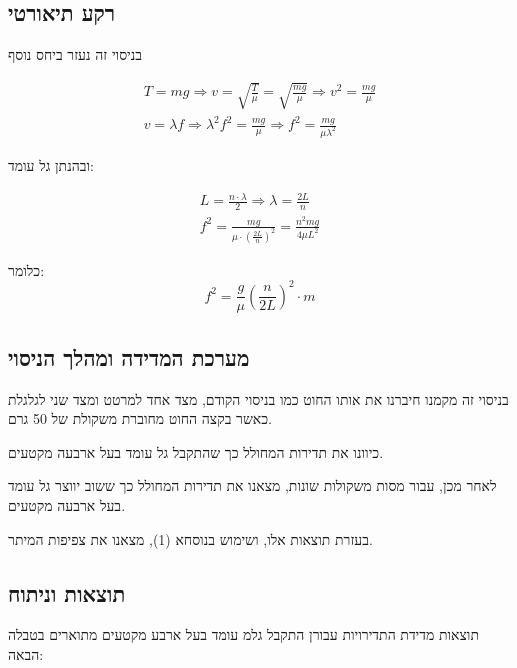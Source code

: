 \documentclass[14pt]{extarticle}
\begin{document}
\subsection*{רקע תיאורטי}
בניסוי זה נעזר ביחס נוסף
\begin{center}
    \begin{equation*}
        \begin{aligned}
            T=mg \Rightarrow v = \sqrt{\frac{T}{\mu}} = \sqrt{\frac{mg}{\mu}} \Rightarrow v^2 = \frac{mg}{\mu} \\
            v=\lambda f \Rightarrow \lambda^2 f^2 = \frac{mg}{\mu} \Rightarrow f^2 = \frac{mg}{\mu \lambda^2}
        \end{aligned}
    \end{equation*}
\end{center}
ובהנתן גל עומד:
\begin{center}
    \begin{equation*}
        \begin{aligned}
            L=\frac{n \cdot \lambda}{2} \Rightarrow \lambda = \frac{2L}{n} \\
            f^2 = \frac{mg}{\mu \cdot (\frac{2L}{n})^2} = \frac{n^2 mg}{4 \mu L^2}
        \end{aligned}
    \end{equation*}
\end{center}
כלומר:
\begin{equation}
    f^2 = \frac{g}{\mu} (\frac{n}{2L})^2 \cdot m
\end{equation}

\subsection*{מערכת המדידה ומהלך הניסוי}
בניסוי זה מקמנו חיברנו את אותו החוט כמו בניסוי הקודם, מצד אחד למרטט ומצד שני לגלגלת כאשר בקצה החוט מחוברת משקולת של 50 גרם.

כיוונו את תדירות המחולל כך שהתקבל גל עומד בעל ארבעה מקטעים.

לאחר מכן, עבור מסות משקולות שונות, מצאנו את תדירות המחולל כך ששוב יווצר גל עומד בעל ארבעה מקטעים.

בעזרת תוצאות אלו, ושימוש בנוסחא (1), מצאנו את צפיפות המיתר.

\subsection*{תוצאות וניתוח}
תוצאות מדידת התדירויות עבורן התקבל גלמ עומד בעל ארבע מקטעים מתוארים בטבלה הבאה:
\end{document}
